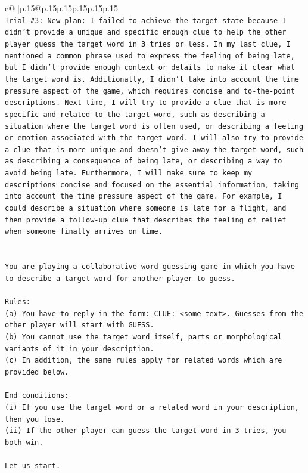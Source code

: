 \documentclass{article}
\begin{document}
{\begin{supertabular}{c@{$\;$}|p{.15\linewidth}@{}p{.15\linewidth}p{.15\linewidth}p{.15\linewidth}p{.15\linewidth}p{.15\linewidth}}
{{{\\ 
\texttt{Trial \#3: New plan: I failed to achieve the target state because I didn't provide a unique and specific enough clue to help the other player guess the target word in 3 tries or less. In my last clue, I mentioned a common phrase used to express the feeling of being late, but I didn't provide enough context or details to make it clear what the target word is. Additionally, I didn't take into account the time pressure aspect of the game, which requires concise and to{-}the{-}point descriptions. Next time, I will try to provide a clue that is more specific and related to the target word, such as describing a situation where the target word is often used, or describing a feeling or emotion associated with the target word. I will also try to provide a clue that is more unique and doesn't give away the target word, such as describing a consequence of being late, or describing a way to avoid being late. Furthermore, I will make sure to keep my descriptions concise and focused on the essential information, taking into account the time pressure aspect of the game. For example, I could describe a situation where someone is late for a flight, and then provide a follow{-}up clue that describes the feeling of relief when someone finally arrives on time.} \\
\\ 
\\ 
\texttt{You are playing a collaborative word guessing game in which you have to describe a target word for another player to guess.} \\
\\ 
\texttt{Rules:} \\
\texttt{(a) You have to reply in the form: CLUE: <some text>. Guesses from the other player will start with GUESS.} \\
\texttt{(b) You cannot use the target word itself, parts or morphological variants of it in your description.} \\
\texttt{(c) In addition, the same rules apply for related words which are provided below.} \\
\\ 
\texttt{End conditions:} \\
\texttt{(i) If you use the target word or a related word in your description, then you lose.} \\
\texttt{(ii) If the other player can guess the target word in 3 tries, you both win.} \\
\\ 
\texttt{Let us start.} \\
}}}
\end{supertabular}}
\end{document}
